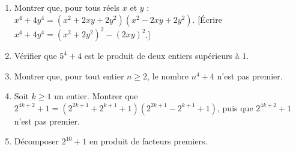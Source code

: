
\begin{enumerate}
  \item Montrer que, pour tous réels $x$ et $y$ : $x^4+4y^4=(x^2+2xy+2y^2)(x^2-2xy+2y^2)$. [Écrire $x^4+4y^4=(x^2+2y^2)^2-(2xy)^2$.]
  \item Vérifier que $5^4+4$ est le produit de deux entiers supérieurs à $1$.
  \item Montrer que, pour tout entier $n\geq2$, le nombre $n^4+4$ n'est pas premier.
  \item Soit $k\geq1$ un entier. Montrer que $2^{4k+2}+1=(2^{2k+1}+2^{k+1}+1)(2^{2k+1}-2^{k+1}+1)$, puis que $2^{4k+2}+1$ n'est pas premier.
  \item Décomposer $2^{10}+1$ en produit de facteurs premiers.
\end{enumerate}

